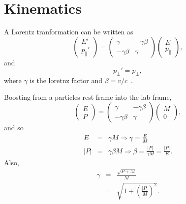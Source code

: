 \chapter{Kinematics}
\label{app:kinematics}
A Lorentz tranformation can be written as
\begin{equation}
\left(\begin{array}{c} E' \\ p_{\parallel}' \end{array} \right)
=
\left(
\begin{array}{cc}
\gamma & -\gamma\beta \\
-\gamma\beta & \gamma
\end{array}
\right)
\left (\begin{array}{c} E \\ p_{\parallel} \end{array}\right),
\end{equation}
and
\begin{equation}
p_{\perp}' = p_{\perp},
\end{equation}
where $\gamma$ is the loretnz factor and $\beta=v/c$~\cite{pdg}.

Boosting from a particles rest frame into the lab frame,
\begin{equation}
\left(\begin{array}{c} E \\ P \end{array} \right)
=
\left(
\begin{array}{cc}
\gamma & -\gamma\beta \\
-\gamma\beta & \gamma
\end{array}
\right)
\left (\begin{array}{c} M \\ 0 \end{array}\right),
\end{equation}
and so
\begin{eqnarray*}
E &=& \gamma M  \Longrightarrow \gamma = \frac{E}{M} \\
|P| &=& \gamma\beta M \Longrightarrow \beta = \frac{|P|}{\gamma M} = \frac{|P|}{E}.
\end{eqnarray*}
Also,
\begin{eqnarray*}
\gamma &=& \frac{\sqrt{P + M}}{M} \\
&=& \sqrt{1 +\left(\frac{|P|}{M}\right)^2}.
\end{eqnarray*}
